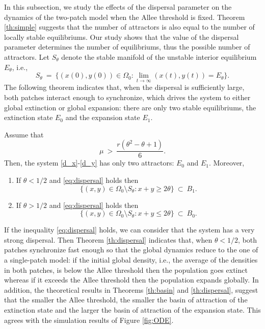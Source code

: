 \indent In this subsection, we study the effects of the dispersal parameter on the dynamics of the two-patch model when the Allee
 threshold is fixed.
 Theorem \ref{th:simple} suggests that the number of attractors is also equal to the number of locally stable equilibriums.
 Our study shows that the value of the dispersal parameter determines the number of equilibriums, thus the possible number
 of attractors.
 Let $S_{\theta}$ denote the stable manifold of the unstable interior equilibrium $E_{\theta}$, i.e.,
 $$ S_{\theta} \ = \ \{(x (0), y (0)) \in \Omega_0 : \lim_{t {{\rightarrow}} \infty} (x (t), y (t)) = E_{\theta} \}. $$
 The following theorem indicates that, when the dispersal is sufficiently large, both patches interact enough to synchronize,
 which drives the system to either global extinction or global expansion: there are only two stable equilibriums, the extinction
 state $E_0$ and the expansion state $E_1$.
\begin{theorem}
\label{th:dispersal}
 Assume that
\begin{equation}
\label{eq:dispersal}
 \mu \ > \ \frac{r (\theta^2 - \theta + 1)}{6}.
\end{equation}
 Then, the system \eqref{d_x}-\eqref{d_y} has only two attractors: $E_0$ and $E_1$. Moreover,
\begin{enumerate}
\item If $\theta < 1/2$ and \eqref{eq:dispersal} holds then
 $$ \{(x, y) \in \Omega_0 \setminus S_{\theta} : x + y \geq 2 \theta \} \ \subset \ B_1. $$
\item If $\theta > 1/2$ and \eqref{eq:dispersal} holds then
 $$ \{(x, y) \in \Omega_0 \setminus S_{\theta} : x + y \leq 2 \theta \} \ \subset \ B_0. $$
\end{enumerate}
\end{theorem}
\noindent If the inequality \eqref{eq:dispersal} holds,  we can consider that the system has a very strong dispersal.
 Then Theorem \ref{th:dispersal} indicates that, when $\theta < 1/2$, both patches synchronize fast enough so that the global dynamics
 reduce to the one of a single-patch model: if the initial global density, i.e., the average of the densities in both patches, is
 below the Allee threshold then the population goes extinct whereas if it exceeds the Allee threshold then the population expands globally.
 In addition, the theoretical results in Theorems \ref{th:basin} and \ref{th:dispersal}, suggest that the smaller the Allee threshold,
 the smaller the basin of attraction of the extinction state and the larger the basin of attraction of the expansion state.
 This agrees with the simulation results of Figure \ref{fig:ODE}.


